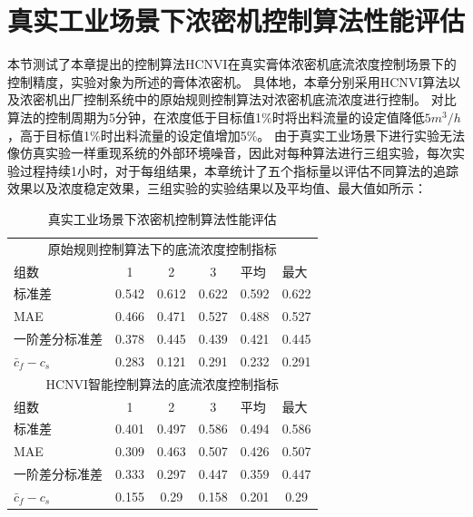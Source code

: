 \section{真实工业场景下浓密机控制算法性能评估}
本节测试了本章提出的控制算法HCNVI在真实膏体浓密机底流浓度控制场景下的控制精度，实验对象为所述的膏体浓密机。
具体地，本章分别采用HCNVI算法以及浓密机出厂控制系统中的原始规则控制算法对浓密机底流浓度进行控制。
对比算法的控制周期为5分钟，在浓度低于目标值1\%时将出料流量的设定值降低$5m^3/h$，高于目标值1\%时出料流量的设定值增加5\%。
由于真实工业场景下进行实验无法像仿真实验一样重现系统的外部环境噪音，因此对每种算法进行三组实验，每次实验过程持续1小时，对于每组结果，本章统计了五个指标量以评估不同算法的追踪效果以及浓度稳定效果，三组实验的实验结果以及平均值、最大值如所示：
\begin{table}[htb]
  \centering
  \caption{真实工业场景下浓密机控制算法性能评估}
    \begin{tabular}{lccccc}
    \toprule
    \multicolumn{6}{c}{原始规则控制算法下的底流浓度控制指标} \\
    \multicolumn{1}{l}{组数} & 1     & 2     & 3     & \multicolumn{1}{l}{平均} & \multicolumn{1}{l}{最大} \\
    \hline
    \multicolumn{1}{l}{标准差} & 0.542 & 0.612 & 0.622 & 0.592 & 0.622 \\
    \multicolumn{1}{l}{MAE} & 0.466 & 0.471 & 0.527 & 0.488 & 0.527 \\
    \multicolumn{1}{l}{一阶差分标准差} & 0.378 & 0.445 & 0.439 & 0.421 & 0.445 \\
    $\bar{c}_{f}-{c}_{s}$   & 0.283 & 0.121 & 0.291 & 0.232 & 0.291 \\
    \midrule
    \multicolumn{6}{c}{HCNVI智能控制算法的底流浓度控制指标} \\
    \multicolumn{1}{l}{组数} & 1     & 2     & 3     & \multicolumn{1}{l}{平均} & \multicolumn{1}{l}{最大} \\
    \hline
    \multicolumn{1}{l}{标准差} & 0.401 & 0.497 & 0.586 & 0.494 & 0.586 \\
    \multicolumn{1}{l}{MAE} & 0.309 & 0.463 & 0.507 & 0.426 & 0.507 \\
    \multicolumn{1}{l}{一阶差分标准差} & 0.333 & 0.297 & 0.447 & 0.359 & 0.447 \\
    $\bar{c}_{f}-{c}_{s}$     & 0.155 & 0.29  & 0.158 & 0.201 & 0.29 \\
    \bottomrule
    \end{tabular}%
  \label{tab:industrial_thickening_eval}%
\end{table}%
